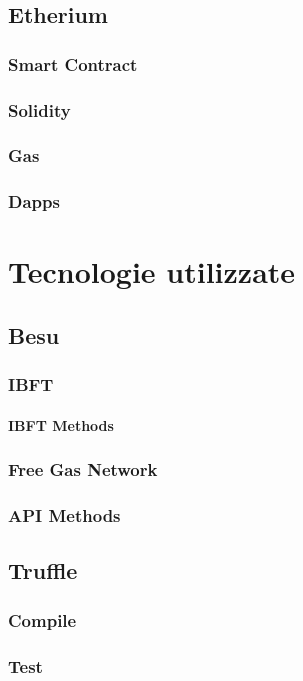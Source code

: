 \documentclass[12pt]{report}
\begin{document}
\section{Etherium}
\subsection{Smart Contract}
\subsection{Solidity}
\subsection{Gas}
\subsection{Dapps}

\chapter{Tecnologie utilizzate}
\section{Besu}
\subsection{IBFT}
\subsubsection{IBFT Methods}
\subsection{Free Gas Network}
\subsection{API Methods}
\section{Truffle}
\subsection{Compile}
\subsection{Test}
\end{document}
